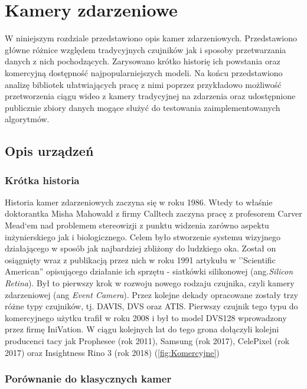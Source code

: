 \chapter{Kamery zdarzeniowe}
\label{cha: KameryZdarzeniowe}

W niniejszym rozdziale przedstawiono opis kamer zdarzeniowych. Przedstawiono główne różnice względem tradycyjnych czujników jak i sposoby przetwarzania danych z nich pochodzących. Zarysowano krótko historię ich powstania oraz komercyjną dostępność najpopularniejszych modeli. Na końcu przedstawiono analizę bibliotek ułatwiających pracę z nimi poprzez przykładowo możliwość przetworzenia ciągu wideo z kamery tradycyjnej na zdarzenia oraz udostępnione publicznie zbiory danych mogące służyć do testowania zaimplementowanych algorytmów.
\section{Opis urządzeń}
\label{sec:OpisUrzadzen}

    \subsection{Krótka historia}
    \label{subsec:historia}
    
    Historia kamer zdarzeniowych zaczyna się w roku 1986. Wtedy to właśnie doktorantka Misha Mahowald z firmy Calltech zaczyna pracę z profesorem Carver Mead`em nad problemem stereowizji z punktu widzenia zarówno aspektu inżynierskiego jak i biologicznego. Celem było stworzenie systemu wizyjnego działającego w sposób jak najbardziej zbliżony do ludzkiego oka. Został on osiągnięty wraz z publikacją przez nich w roku 1991 artykułu w ''Scientific American'' opisującego działanie ich sprzętu - siatkówki silikonowej (ang.\emph{Silicon Retina}). Był to pierwszy krok w rozwoju nowego rodzaju czujnika, czyli kamery zdarzeniowej (ang \emph{Event Camera}). Przez kolejne dekady opracowane zostały trzy różne typy czujników, tj. DAVIS, DVS oraz ATIS. Pierwszy czujnik tego typu do komercyjnego użytku trafił w roku 2008  i był to model DVS128 wprowadzony przez firmę IniVation. W ciągu kolejnych lat do tego grona dołączyli kolejni producenci tacy jak Prophesee (rok 2011), Samsung (rok 2017), CelePixel (rok 2017) oraz Insightness Rino 3 (rok 2018) (\ref{fig:Komercyjne})
    
    
    \subsection{Porównanie do klasycznych kamer}
    \label{subsec:Porownanie}
    
